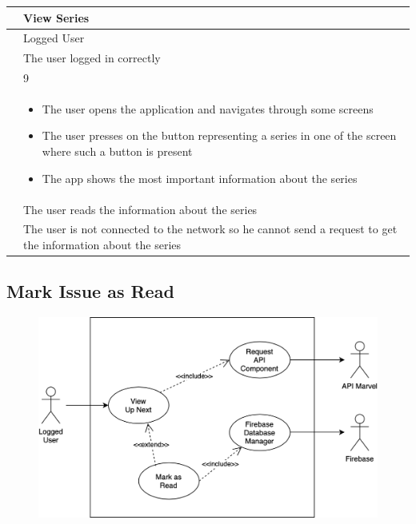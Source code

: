 {{{{{\renewcommand{\arraystretch}{2}
{\begin{center}
\begin{tabular}{ | m{4cm} | m{9cm} | } 
 \hline
 {\centering{\textbf{Name}}} & View Series \\
 \hline
 {\centering{\textbf{Actor}}} & Logged User \\
 \hline
 {\centering{\textbf{Entry Condition}}} & The user logged in correctly \\
 \hline
 {\centering{\textbf{Goal}}} & 9 \\
 \hline
 {\centering{\textbf{Event flow}}} & \begin{itemize}[leftmargin=*]
 	\item The user opens the application and navigates through some screens
	\item The user presses on the button representing a series in one of the screen where such a button is present
	\item The app shows the most important information about the series
	\end{itemize} \\	
 \hline
 {\centering{\textbf{Exit condition}}} & The user reads the information about the series \\
 \hline
 {\centering{\textbf{Exceptions}}} & The user is not connected to the network so he cannot send a request to get the information about the series \\
 \hline
\end{tabular}
\end{center}}

\clearpage

\subsection{Mark Issue as Read}
\begin{figure}[h]
\centering
\includegraphics[width=\textwidth]{img/usecases/readissue}
\end{figure}

}}}}}
